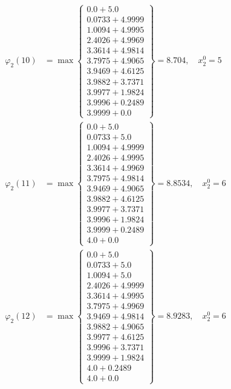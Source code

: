 \documentclass{article}
\begin{document}
\begin{align*}
  
  
  
\varphi_{2}(10) &= \max \left\{ \begin{array}{c}
0.0 + 5.0 \\
 0.0733 + 4.9999 \\
 1.0094 + 4.9995 \\
 2.4026 + 4.9969 \\
 3.3614 + 4.9814 \\
 3.7975 + 4.9065 \\
 3.9469 + 4.6125 \\
 3.9882 + 3.7371 \\
 3.9977 + 1.9824 \\
 3.9996 + 0.2489 \\
 3.9999 + 0.0
\end{array} \right\}=8.704,\quad x_{2}^0=5\\
  
  
  
  
\varphi_{2}(11) &= \max \left\{ \begin{array}{c}
0.0 + 5.0 \\
 0.0733 + 5.0 \\
 1.0094 + 4.9999 \\
 2.4026 + 4.9995 \\
 3.3614 + 4.9969 \\
 3.7975 + 4.9814 \\
 3.9469 + 4.9065 \\
 3.9882 + 4.6125 \\
 3.9977 + 3.7371 \\
 3.9996 + 1.9824 \\
 3.9999 + 0.2489 \\
 4.0 + 0.0
\end{array} \right\}=8.8534,\quad x_{2}^0=6\\
  
  
  
  
\varphi_{2}(12) &= \max \left\{ \begin{array}{c}
0.0 + 5.0 \\
 0.0733 + 5.0 \\
 1.0094 + 5.0 \\
 2.4026 + 4.9999 \\
 3.3614 + 4.9995 \\
 3.7975 + 4.9969 \\
 3.9469 + 4.9814 \\
 3.9882 + 4.9065 \\
 3.9977 + 4.6125 \\
 3.9996 + 3.7371 \\
 3.9999 + 1.9824 \\
 4.0 + 0.2489 \\
 4.0 + 0.0
\end{array} \right\}=8.9283,\quad x_{2}^0=6\\
  

\end{align*}
\end{document}
